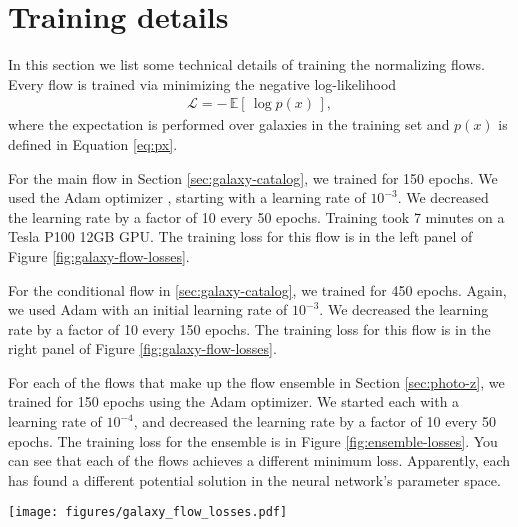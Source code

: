 \documentclass[twocolumn,twocolappendix]{aastex631}
\begin{document}

\appendix

\section{Training details}
\label{app:training-details}

In this section we list some technical details of training the normalizing flows.
Every flow is trained via minimizing the negative log-likelihood
\begin{align}
    \mathcal{L} = - \, \mathbb{E}[ \, \log p(x) \, ],
\end{align}
where the expectation is performed over galaxies in the training set and $p(x)$ is defined in Equation \ref{eq:px}.

For the main flow in Section \ref{sec:galaxy-catalog}, we trained for 150 epochs.
We used the Adam optimizer \citep{adam}, starting with a learning rate of $10^{-3}$.
We decreased the learning rate by a factor of 10 every 50 epochs.
Training took 7 minutes on a Tesla P100 12GB GPU.
The training loss for this flow is in the left panel of Figure \ref{fig:galaxy-flow-losses}.

For the conditional flow in \ref{sec:galaxy-catalog}, we trained for 450 epochs.
Again, we used Adam with an initial learning rate of $10^{-3}$.
We decreased the learning rate by a factor of 10 every 150 epochs.
The training loss for this flow is in the right panel of Figure \ref{fig:galaxy-flow-losses}.

For each of the flows that make up the flow ensemble in Section \ref{sec:photo-z}, we trained for 150 epochs using the Adam optimizer.
We started each with a learning rate of $10^{-4}$, and decreased the learning rate by a factor of 10 every 50 epochs.
The training loss for the ensemble is in Figure \ref{fig:ensemble-losses}.
You can see that each of the flows achieves a different minimum loss.
Apparently, each has found a different potential solution in the neural network's parameter space.

\begin{figure*}[t!]
    \begin{centering}
        \texttt{[image: figures/galaxy\_flow\_losses.pdf]}
        \caption{
            Training losses for the normalizing flows.
            Left: losses for the regular flow.
            After epochs 50 and 100, you can see a drop in the loss due to the decrease in the learning rate.
            Right: losses for the conditional flow.
            After epochs 150 and 300, you can see a drop in the loss due to the decrease in the learning rate.
        }
        \label{fig:galaxy-flow-losses}
    \end{centering}
\end{figure*}
\end{document}
